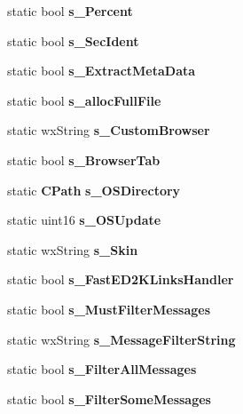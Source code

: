 \begin{DoxyCompactItemize}
\item 
static bool {\bfseries s\_\-Percent}\label{classCPreferences_a587b1211f06ed557567d2cd4d1b63b60}

\item 
static bool {\bfseries s\_\-SecIdent}\label{classCPreferences_ab1b33952b74d87fefec2afada7b9dc22}

\item 
static bool {\bfseries s\_\-ExtractMetaData}\label{classCPreferences_a50578c1bc7864b6d4f78696672927120}

\item 
static bool {\bfseries s\_\-allocFullFile}\label{classCPreferences_a047c85c64cbedff3eefed3c4251f2a06}

\item 
static wxString {\bfseries s\_\-CustomBrowser}\label{classCPreferences_a2a1d2a12e9d6cbdc1d285a88a394dad8}

\item 
static bool {\bfseries s\_\-BrowserTab}\label{classCPreferences_a7d7f9c1d0334d5b07d0c2e349b83b6d7}

\item 
static {\bf CPath} {\bfseries s\_\-OSDirectory}\label{classCPreferences_a11eb42f6b450043ba25edc1f76f10dad}

\item 
static uint16 {\bfseries s\_\-OSUpdate}\label{classCPreferences_a017da47cdd43c815bd06cef2e40f1629}

\item 
static wxString {\bfseries s\_\-Skin}\label{classCPreferences_aa2bbffecbc1226c0451fc16f9e880694}

\item 
static bool {\bfseries s\_\-FastED2KLinksHandler}\label{classCPreferences_ab6fb0ce04e8e832d5c761f0b76568310}

\item 
static bool {\bfseries s\_\-MustFilterMessages}\label{classCPreferences_a3e1d75905eceb9d24c4b8386a90fd072}

\item 
static wxString {\bfseries s\_\-MessageFilterString}\label{classCPreferences_afc314532291d5912b2c2f0f839734625}

\item 
static bool {\bfseries s\_\-FilterAllMessages}\label{classCPreferences_a21e780c78b1777c4bb9a8edbdbd7ec99}

\item 
static bool {\bfseries s\_\-FilterSomeMessages}\label{classCPreferences_afaec59a718915c5435458ee18ef833a8}


\end{DoxyCompactItemize}
